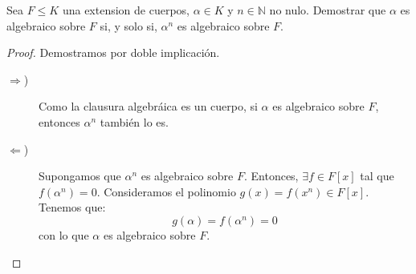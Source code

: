 \begin{ejercicio}
    Sea $F\leq K$ una extension de cuerpos, $\alpha \in K$ y $n\in \mathbb{N}$ no nulo. Demostrar que $\alpha$ es algebraico sobre $F$ si, y solo si, $\alpha^n$ es algebraico sobre $F$.
    \begin{proof} Demostramos por doble implicación.
        \begin{description}
            \item[$\Longrightarrow$)] Como la clausura algebráica es un cuerpo, si $\alpha$ es algebraico sobre $F$, entonces $\alpha^n$ también lo es.
            \item[$\Longleftarrow$)] Supongamos que $\alpha^n$ es algebraico sobre $F$. Entonces, $\exists f\in F[x]$ tal que $f(\alpha^n)=0$. Consideramos el polinomio $g(x) = f(x^n)\in F[x]$. Tenemos que:
            \begin{equation*}
                g(\alpha) = f(\alpha^n) = 0
            \end{equation*}
            con lo que $\alpha$ es algebraico sobre $F$. 
        \end{description}
    \end{proof}
\end{ejercicio}

